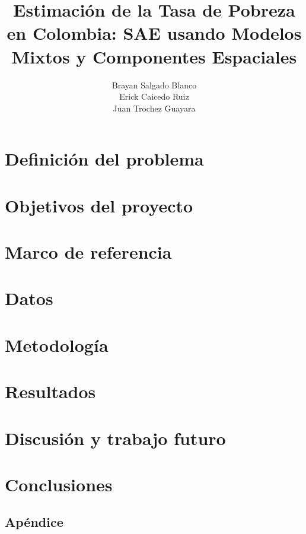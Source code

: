 \documentclass{unipd-thesis-modern} %
\title{Estimación de la Tasa de Pobreza en Colombia: SAE usando Modelos Mixtos y Componentes Espaciales}
\author{Brayan Salgado Blanco \\Erick Caicedo Ruiz \\Juan Trochez Guayara
}
\begin{document}
\raggedbottom
\renewcommand{\tablename}{Tabla}
\renewcommand{\listfigurename}{Lista de figuras}
\renewcommand{\listtablename}{Lista de tablas}
    \frontmatter
    
    \newpage
    \mainmatter
    \chapter{Definición del problema}
        
        
    \chapter{Objetivos del proyecto} %
        
        
    \chapter{Marco de referencia}
        
        
    \chapter{Datos}
        
    \chapter{Metodología}
        
     \chapter{Resultados}
        
    \chapter{Discusión y trabajo futuro}
        
    \chapter{Conclusiones}
        
    \clearpage
    \printbibliography
     \begin{appendices}
    \chapter{Apéndice}
        
    \end{appendices}
\end{document}
